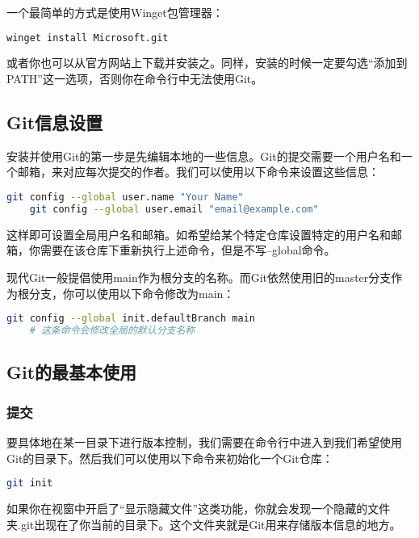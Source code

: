 \documentclass[../main.tex]{subfiles}
\begin{document}
一个最简单的方式是使用Winget包管理器：

\begin{lstlisting}[language=bash]
    winget install Microsoft.git
\end{lstlisting}

或者你也可以从官方网站上下载并安装之。同样，安装的时候一定要勾选“添加到PATH”这一选项，否则你在命令行中无法使用Git。

\subsection{Git信息设置}

安装并使用Git的第一步是先编辑本地的一些信息。Git的提交需要一个用户名和一个邮箱，来对应每次提交的作者。我们可以使用以下命令来设置这些信息：

\begin{lstlisting}[language=bash]
    git config --global user.name "Your Name"
    git config --global user.email "email@example.com"
\end{lstlisting}

这样即可设置全局用户名和邮箱。如希望给某个特定仓库设置特定的用户名和邮箱，你需要在该仓库下重新执行上述命令，但是不写--global命令。

现代Git一般提倡使用main作为根分支的名称。而Git依然使用旧的master分支作为根分支，你可以使用以下命令修改为main：

\begin{lstlisting}[language=bash]
    git config --global init.defaultBranch main
    # 这条命令会修改全局的默认分支名称
\end{lstlisting}

\subsection{Git的最基本使用}

\subsubsection{提交}

要具体地在某一目录下进行版本控制，我们需要在命令行中进入到我们希望使用Git的目录下。然后我们可以使用以下命令来初始化一个Git仓库：

\begin{lstlisting}[language=bash]
    git init
\end{lstlisting}

如果你在视窗中开启了“显示隐藏文件”这类功能，你就会发现一个隐藏的文件夹.git出现在了你当前的目录下。这个文件夹就是Git用来存储版本信息的地方。
\end{document}
